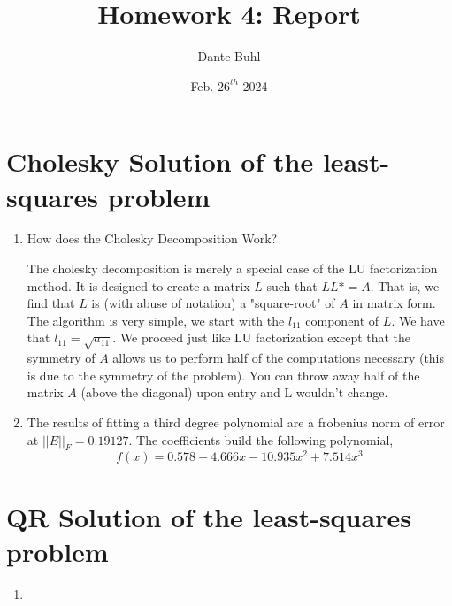 \documentclass{article}
\title{Homework 4: Report}
\author{Dante Buhl}
\date{Feb. $26^{th}$ 2024}
\begin{document}
\newcommand{\bs}[1]{\boldsymbol{#1}}
\newcommand{\bmp}[1]{\begin{minipage}{#1\textwidth}}
\newcommand{\emp}{\end{minipage}}
\newcommand{\R}{\mathbb{R}}
\newcommand{\C}{\mathbb{C}}
\newcommand{\N}{\mathcal{N}}
\newcommand{\I}{\mathrm{I}}
\newcommand{\K}{\bs{\mathrm{K}}}
\newcommand{\m}{\bs{\mu}_*}
\newcommand{\s}{\bs{\Sigma}_*}
\newcommand{\dt}{\Delta t}
\newcommand{\tr}[1]{\text{Tr}(#1)}
\newcommand{\Tr}[1]{\text{Tr}(#1)}

\maketitle


\setcounter{section}{1}

\section{Cholesky Solution of the least-squares problem}
\begin{enumerate}
\item How does the Cholesky Decomposition Work?

The cholesky decomposition is merely a special case of the LU factorization method. It is designed to create a matrix $L$ such that $LL* = A$. That is, we find that $L$ is (with abuse of notation) a "square-root" of $A$ in matrix form. The algorithm is very simple, we start with the $l_{11}$ component of $L$. We have that $l_{11} = \sqrt{a_{11}}$. We proceed just like LU factorization except that the symmetry of $A$ allows us to perform half of the computations necessary (this is due to the symmetry of the problem). You can throw away half of the matrix $A$ (above the diagonal) upon entry and L wouldn't change. 

\item The results of fitting a third degree polynomial are a frobenius norm of error at $||E||_F = 0.19127$. The coefficients build the following polynomial, 
    \[
        f(x) = 0.578 + 4.666x - 10.935 x^2 + 7.514x^3
    \]


\end{enumerate}

\section{QR Solution of the least-squares problem}
\begin{enumerate}
\item 

\end{enumerate}
\end{document}
